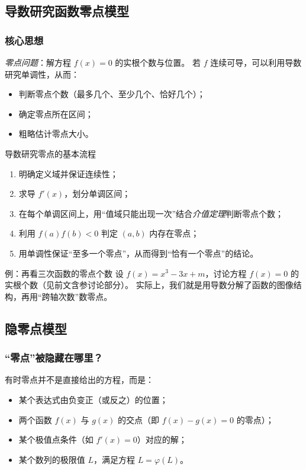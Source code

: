 \documentclass[a4paper,11pt]{ctexart}
\begin{document}
\subsection{导数研究函数零点模型}

\subsubsection{核心思想}

\emph{零点问题}：解方程 $f(x)=0$ 的实根个数与位置。
若 $f$ 连续可导，可以利用导数研究单调性，从而：
\begin{itemize}
  \item 判断零点个数（最多几个、至少几个、恰好几个）；
  \item 确定零点所在区间；
  \item 粗略估计零点大小。
\end{itemize}

\begin{summarybox}{导数研究零点的基本流程}
  \begin{enumerate}
    \item 明确定义域并保证连续性；
    \item 求导 $f'(x)$，划分单调区间；
    \item 在每个单调区间上，用“值域只能出现一次”结合\emph{介值定理}判断零点个数；
    \item 利用 $f(a)f(b)<0$ 判定 $(a,b)$ 内存在零点；
    \item 用单调性保证“至多一个零点”，从而得到“恰有一个零点”的结论。
  \end{enumerate}
\end{summarybox}

\begin{examplebox}[mathnote coverage=soft]{例：再看三次函数的零点个数}
  设 $f(x)=x^3-3x+m$，讨论方程 $f(x)=0$ 的实根个数（见前文含参讨论部分）。
  实际上，我们就是用导数分解了函数的图像结构，再用“跨轴次数”数零点。
\end{examplebox}

\subsection{隐零点模型}

\subsubsection{“零点”被隐藏在哪里？}

有时零点并不是直接给出的方程，而是：
\begin{itemize}
  \item 某个表达式由负变正（或反之）的位置；
  \item 两个函数 $f(x)$ 与 $g(x)$ 的交点（即 $f(x)-g(x)=0$ 的零点）；
  \item 某个极值点条件（如 $f'(x)=0$）对应的解；
  \item 某个数列的极限值 $L$，满足方程 $L=\varphi(L)$。
\end{itemize}
\end{document}
